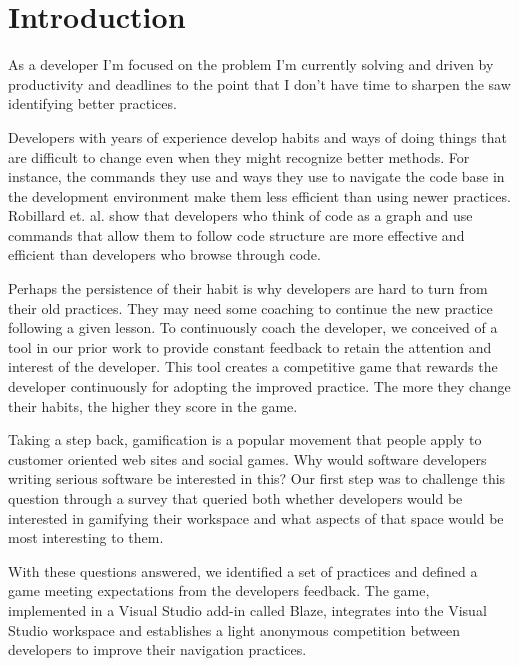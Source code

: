 \documentclass{sig-alternate}
\begin{document}


\section{Introduction}

As  a developer I'm focused on the problem I'm currently solving and driven by productivity and deadlines to the point that I don't have time to sharpen the saw identifying better practices.  

Developers with years of experience develop habits and ways of doing things that are difficult to change even when they might recognize better methods.   For instance, the commands they use and ways they use to navigate the code base in the development environment make them less efficient than using newer practices. Robillard et. al. show that developers who think of code as a graph and use commands that allow them to follow code structure are more effective and efficient than developers who browse through code. \cite{wbsnipes:Robillard2004How}  

Perhaps the persistence of their habit is why developers are hard to turn from their old practices.  They may need some coaching to continue the new practice following a given lesson.  To continuously coach the developer, we conceived of a tool in our prior work to provide constant feedback to retain the attention and interest of the developer.  \cite{Snipes2013Towards} This tool creates a competitive game that rewards the developer continuously for adopting the improved practice.  The more they change their habits, the higher they score in the game. 

Taking a step back, gamification is a popular movement that people apply to customer oriented web sites and social games.  Why would software developers writing serious software be interested in this?  Our first step was to challenge this question through a survey that queried both whether developers would be interested in gamifying their workspace and what aspects of that space would be most interesting to them.

With these questions answered, we identified a set of practices and defined a game meeting expectations from the developers feedback.  The game, implemented in a Visual Studio add-in called Blaze, integrates into the Visual Studio workspace and establishes a light anonymous competition between developers to improve their navigation practices. 
\end{document}

